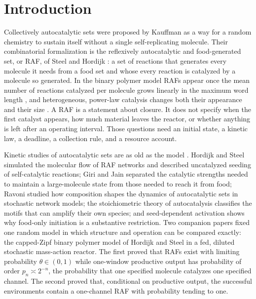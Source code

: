 \documentclass[11pt,letterpaper]{article}
\theoremstyle{plain}
\theoremstyle{definition}
\theoremstyle{remark}
\numberwithin{equation}{section}
\begin{document}
\section{Introduction}\label{sec:intro}

Collectively autocatalytic sets were proposed by Kauffman \cite{kauffman1986autocatalytic} as a way for a random chemistry to sustain itself without a single self-replicating molecule. Their combinatorial formalization is the reflexively autocatalytic and food-generated set, or RAF, of Steel and Hordijk \cite{steel2000emergence,hordijk2004detecting,steel2019autocatalytic}: a set of reactions that generates every molecule it needs from a food set and whose every reaction is catalyzed by a molecule so generated. In the binary polymer model RAFs appear once the mean number of reactions catalyzed per molecule grows linearly in the maximum word length \cite{mossel2005random,hordijk2011required}, and heterogeneous, power-law catalysis changes both their appearance and their size \cite{hordijk2014powerlaw,hordijk2016variable,hordijk2017chasing}. A RAF is a statement about closure. It does not specify when the first catalyst appears, how much material leaves the reactor, or whether anything is left after an operating interval. Those questions need an initial state, a kinetic law, a deadline, a collection rule, and a resource account.

Kinetic studies of autocatalytic sets are as old as the model \cite{farmer1986autocatalytic}. Hordijk and Steel \cite{hordijk2012extended} simulated the molecular flow of RAF networks and described uncatalyzed seeding of self-catalytic reactions; Giri and Jain \cite{giri2012origin} separated the catalytic strengths needed to maintain a large-molecule state from those needed to reach it from food; Ravoni \cite{ravoni2020composition} studied how composition shapes the dynamics of autocatalytic sets in stochastic network models; the stoichiometric theory of autocatalysis \cite{blokhuis2020universal,unterberger2022stoechiometric,nandan2026cores} classifies the motifs that can amplify their own species; and seed-dependent activation \cite{peng2022hierarchical} shows why food-only initiation is a substantive restriction. Two companion papers fixed one random model in which structure and operation can be compared exactly: the capped-Zipf binary polymer model of Hordijk and Steel in a fed, diluted stochastic mass-action reactor. The first \cite{structural2026} proved that RAFs exist with limiting probability $\theta\in(0,1)$ while one-window productive output has probability of order $p_n\asymp2^{-n}$, the probability that one specified molecule catalyzes one specified channel. The second \cite{diffuse2026} proved that, conditional on productive output, the successful environments contain a one-channel RAF with probability tending to one.
\end{document}
